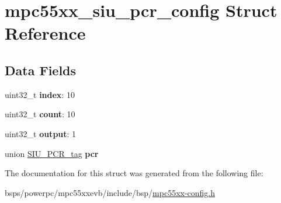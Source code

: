 \hypertarget{structmpc55xx__siu__pcr__config}{}\section{mpc55xx\+\_\+siu\+\_\+pcr\+\_\+config Struct Reference}
\label{structmpc55xx__siu__pcr__config}
\subsection*{Data Fields}
\begin{DoxyCompactItemize}
\item 
\mbox{\label{structmpc55xx__siu__pcr__config_a2a8267ce1115b132baf75eb8fa28f428}} 
uint32\+\_\+t {\bfseries index}\+: 10
\item 
\mbox{\label{structmpc55xx__siu__pcr__config_a9f37a239a9a3d0d1a284ed1e6bb719f2}} 
uint32\+\_\+t {\bfseries count}\+: 10
\item 
\mbox{\label{structmpc55xx__siu__pcr__config_a4b77d798047c56a641179cc0488cce2e}} 
uint32\+\_\+t {\bfseries output}\+: 1
\item 
\mbox{\label{structmpc55xx__siu__pcr__config_aa78fce2bae342904e58403aeebba45c6}} 
union \mbox{\hyperlink{unionSIU__PCR__tag}{S\+I\+U\+\_\+\+P\+C\+R\+\_\+tag}} {\bfseries pcr}
\end{DoxyCompactItemize}


The documentation for this struct was generated from the following file\+:\begin{DoxyCompactItemize}
\item 
bsps/powerpc/mpc55xxevb/include/bsp/\mbox{\hyperlink{mpc55xx-config_8h}{mpc55xx-\/config.\+h}}\end{DoxyCompactItemize}
